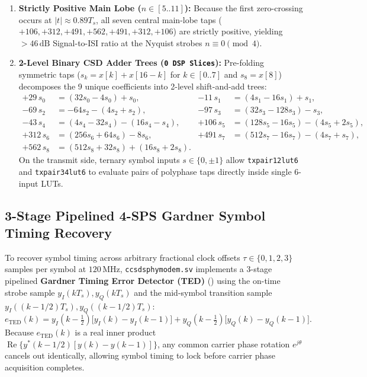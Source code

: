 \documentclass[10pt,a4paper]{article}
\renewcommand{\_}{\origunderscore\penalty0\hskip0pt\relax}
\numberwithin{equation}{section}
\numberwithin{table}{section}
\numberwithin{figure}{section}
\begin{document}
\begin{enumerate}\setlength{\itemsep}{1.5pt}
  \item \textbf{Strictly Positive Main Lobe ($n \in [5..11]$):} Because the first zero-crossing occurs at $|t| \approx 0.89 T_s$, all seven central main-lobe taps ($+106, +312, +491, +562, +491, +312, +106$) are strictly positive, yielding $>46\,\text{dB}$ Signal-to-ISI ratio at the Nyquist strobes $n \equiv 0 \pmod 4$.
  \item \textbf{2-Level Binary CSD Adder Trees (\texttt{0 DSP Slices}):} Pre-folding symmetric taps ($s_k = x[k] + x[16-k]$ for $k \in [0..7]$ and $s_8 = x[8]$) decomposes the 9 unique coefficients into 2-level shift-and-add trees:
  \begin{equation}
  \begin{aligned}
    +29\,s_0 &= (32s_0 - 4s_0) + s_0,           & -11\,s_1  &= (4s_1 - 16s_1) + s_1, \\
    -69\,s_2 &= -64s_2 - (4s_2 + s_2),          & -97\,s_3  &= (32s_3 - 128s_3) - s_3, \\
    -43\,s_4 &= (4s_4 - 32s_4) - (16s_4 - s_4), & +106\,s_5 &= (128s_5 - 16s_5) - (4s_5 + 2s_5), \\
    +312\,s_6 &= (256s_6 + 64s_6) - 8s_6,       & +491\,s_7 &= (512s_7 - 16s_7) - (4s_7 + s_7), \\
    +562\,s_8 &= (512s_8 + 32s_8) + (16s_8 + 2s_8). & &
  \end{aligned}
  \end{equation}
  On the transmit side, ternary symbol inputs $s \in \{0, \pm 1\}$ allow \texttt{tx\_pair12\_lut6} and \texttt{tx\_pair34\_lut6} to evaluate pairs of polyphase taps directly inside single 6-input LUTs.
\end{enumerate}

\subsection{3-Stage Pipelined 4-SPS Gardner Symbol Timing Recovery}
To recover symbol timing across arbitrary fractional clock offsets $\tau \in \{0, 1, 2, 3\}$ samples per symbol at $120\,\text{MHz}$, \texttt{ccsds\_phy\_modem.sv} implements a 3-stage pipelined \textbf{Gardner Timing Error Detector (TED)} (\cite{ccsds401}) using the on-time strobe sample $y_I(k T_s), y_Q(k T_s)$ and the mid-symbol transition sample $y_I((k - 1/2)T_s), y_Q((k - 1/2)T_s)$:
\begin{equation}
  e_{\text{TED}}(k) = y_I\!\left(k - \tfrac{1}{2}\right)\Big[y_I(k) - y_I(k-1)\Big] + y_Q\!\left(k - \tfrac{1}{2}\right)\Big[y_Q(k) - y_Q(k-1)\Big].
\end{equation}
Because $e_{\text{TED}}(k)$ is a real inner product $\operatorname{Re}\{y^*(k-1/2)[y(k)-y(k-1)]\}$, any common carrier phase rotation $e^{j\theta}$ cancels out identically, allowing symbol timing to lock before carrier phase acquisition completes.
\end{document}

